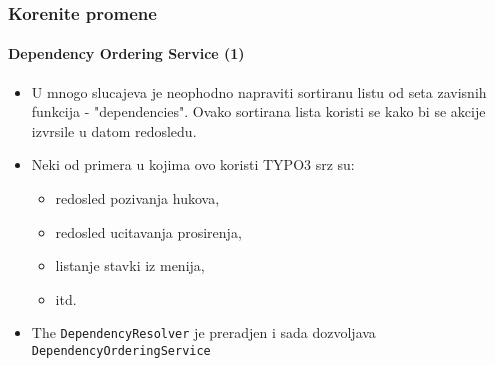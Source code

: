 \begin{frame}[fragile]
	\frametitle{Korenite promene}
	\framesubtitle{Dependency Ordering Service (1)}

	\begin{itemize}

		\item U mnogo slucajeva je neophodno napraviti sortiranu listu od seta zavisnih funkcija - "dependencies". Ovako sortirana lista koristi se kako bi se akcije izvrsile u datom redosledu.

		\item Neki od primera u kojima ovo koristi TYPO3 srz su:

			\begin{itemize}
				\item redosled pozivanja hukova,
				\item redosled ucitavanja prosirenja,
				\item listanje stavki iz menija,
				\item itd.
			\end{itemize}

		\item The \texttt{DependencyResolver} je preradjen i sada dozvoljava
			\texttt{DependencyOrderingService}

	\end{itemize}

\end{frame}



